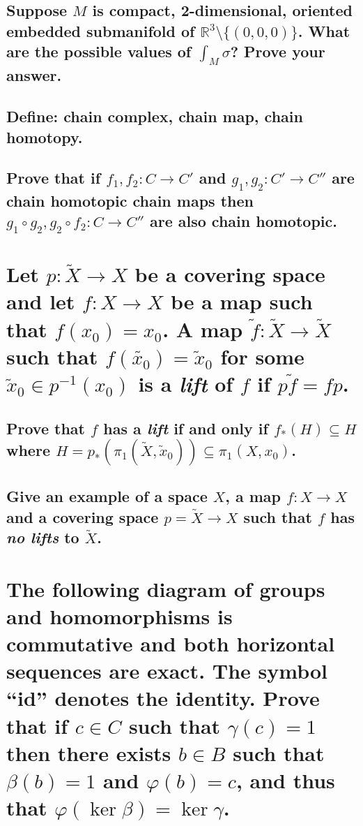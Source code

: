 \documentclass[10pt]{article}
\newcommand{\advsection}{\addtocounter{section}{1} \setcounter{subsection}{0}}
\begin{document}
\subsection{Suppose $M$ is compact, 2-dimensional, oriented embedded submanifold of $\mathbb{R} ^3
  \setminus \{(0,0,0)\}$. What are the possible values of $\int_M \sigma$? Prove your answer.}

\advsection{}

\subsection{Define: chain complex, chain map, chain homotopy.}

\subsection{Prove that if $f_1, f_2 : C \to C'$ and $g_1, g_2 : C' \to C''$ are chain homotopic
  chain maps then $g_1 \circ g_2, g_2 \circ f_2 : C \to C''$ are also chain homotopic.}

\section{Let $p: \tilde{X} \to X$ be a covering space and let $f: X \to X$ be a map such that
  $f(x_0) = x_0$. A map $\tilde{f} : \tilde{X} \to \tilde{X}$ such that $f(\tilde{x_0}) =
  \tilde{x}_0$ for some $\tilde{x}_0 \in p^{-1} (x_0)$ is a \emph{lift} of $f$ if $p\tilde{f} =
  fp$.}

\subsection{Prove that $f$ has a \emph{lift} if and only if $f_*(H) \subseteq H$ where $H =
  p_*(\pi_1(\tilde{X}, \tilde{x}_0)) \subseteq \pi_1(X, x_0)$.}

\subsection{Give an example of a space $X$, a map $f : X \to X$ and a covering space $p = \tilde{X}
  \to X$ such that $f$ has \emph{no lifts} to $\tilde{X}$.}

\section{The following diagram of groups and homomorphisms is commutative and both horizontal
  sequences are exact. The symbol ``id'' denotes the identity. Prove that if $c \in C$ such that
  $\gamma(c) =1$ then there exists $b \in B$ such that $\beta(b) =1$ and $\varphi(b) =c$, and thus
  that $\varphi( \ker \beta) = \ker \gamma$.}
\end{document}
